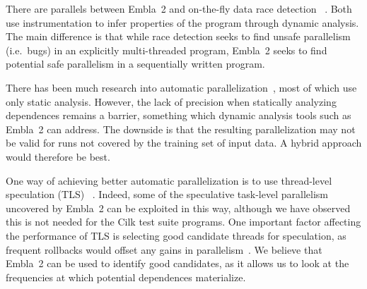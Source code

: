 There are parallels between Embla~2 and on-the-fly data race detection~
\cite{MellorCrummey91onthefly,savage97eraser}.  Both use
instrumentation to infer properties of the program through dynamic
analysis.  The main difference is that while race detection seeks to
find unsafe parallelism (i.e.\ bugs) in an explicitly multi-threaded
program, Embla~2 seeks to find potential safe parallelism in a
sequentially written program.

There has been much research into automatic parallelization~\cite{kennedy02optimizing,Blume94polaris},
most of which use only static analysis.  However,
the lack of precision when statically analyzing dependences remains a
barrier, something which dynamic analysis tools such as Embla~2 can address.
The downside is that the resulting parallelization may not be valid
for runs not covered by the training set of input data.
A hybrid approach would therefore be best.

One way of achieving better automatic parallelization is to use
thread-level speculation (TLS)~
\cite{Rundberg01anall-software,gregory05stampede}.
Indeed, some of the speculative
task-level parallelism uncovered by Embla~2 can be exploited in
this way, 
although we have observed this is not needed for the Cilk test suite programs.
One important factor affecting the performance of TLS is
selecting good candidate threads for speculation, as frequent
rollbacks would offset any gains in parallelism~\cite{johnson04mincut,liu06posh}.
We believe that Embla~2 can be used to identify good
candidates, as it allows us to look at the frequencies at which
potential dependences materialize.
